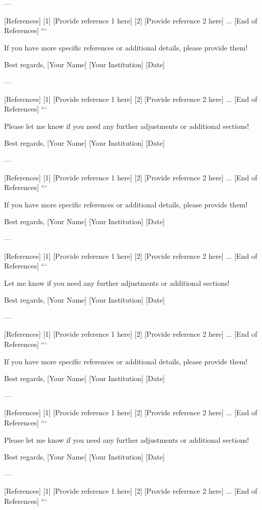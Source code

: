 --- 

[References]  
[1] [Provide reference 1 here]  
[2] [Provide reference 2 here]  
...  
[End of References]  
``` 

If you have more specific references or additional details, please provide them! 

Best regards,  
[Your Name]  
[Your Institution]  
[Date]  

--- 

[References]  
[1] [Provide reference 1 here]  
[2] [Provide reference 2 here]  
...  
[End of References]  
``` 

Please let me know if you need any further adjustments or additional sections! 

Best regards,  
[Your Name]  
[Your Institution]  
[Date]  

--- 

[References]  
[1] [Provide reference 1 here]  
[2] [Provide reference 2 here]  
...  
[End of References]  
``` 

If you have more specific references or additional details, please provide them! 

Best regards,  
[Your Name]  
[Your Institution]  
[Date]  

--- 

[References]  
[1] [Provide reference 1 here]  
[2] [Provide reference 2 here]  
...  
[End of References]  
``` 

Let me know if you need any further adjustments or additional sections! 

Best regards,  
[Your Name]  
[Your Institution]  
[Date]  

--- 

[References]  
[1] [Provide reference 1 here]  
[2] [Provide reference 2 here]  
...  
[End of References]  
``` 

If you have more specific references or additional details, please provide them! 

Best regards,  
[Your Name]  
[Your Institution]  
[Date]  

--- 

[References]  
[1] [Provide reference 1 here]  
[2] [Provide reference 2 here]  
...  
[End of References]  
``` 

Please let me know if you need any further adjustments or additional sections! 

Best regards,  
[Your Name]  
[Your Institution]  
[Date]  

--- 

[References]  
[1] [Provide reference 1 here]  
[2] [Provide reference 2 here]  
...  
[End of References]  
``` 

